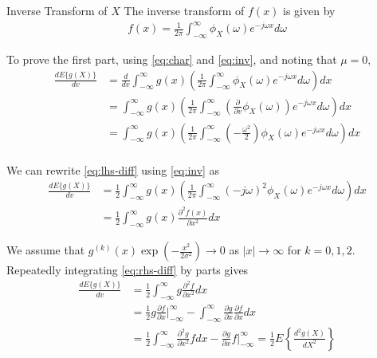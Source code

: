 \documentclass{beamer}
\begin{document}
\begin{frame}
	\begin{alertblock}{Inverse Transform of $X$}
		The inverse transform of $f(x)$ is given by
		\begin{align}
			f(x) = \frac{1}{2\pi}\int_{-\infty}^{\infty}\phi_X(\omega)e^{-j\omega x}d\omega
			\label{eq:inv}
		\end{align}
	\end{alertblock}
	To prove the first part, using \eqref{eq:char} and \eqref{eq:inv}, and noting that $\mu = 0$,
	\begin{align}
		\frac{dE\{g(X)\}}{dv} &= \frac{d}{dv}\int_{-\infty}^{\infty}g(x)\left(\frac{1}{2\pi}\int_{-\infty}^{\infty}\phi_X(\omega)e^{-j\omega x}d\omega\right)dx \\
		&= \int_{-\infty}^{\infty}g(x)\left(\frac{1}{2\pi}\int_{-\infty}^{\infty}\left(\frac{\partial}{\partial v}\phi_X(\omega)\right)e^{-j\omega x}d\omega\right)dx \\
		&= \int_{-\infty}^{\infty}g(x)\left(\frac{1}{2\pi}\int_{-\infty}^{\infty}\left(-\frac{\omega^2}{2}\right)\phi_X(\omega)e^{-j\omega x}d\omega\right)dx \\
		\label{eq:lhs-diff}
	\end{align}
\end{frame}

\begin{frame}
	We can rewrite \eqref{eq:lhs-diff} using \eqref{eq:inv} as
	\begin{align}
		\frac{dE\{g(X)\}}{dv} &= \frac{1}{2}\int_{-\infty}^{\infty}g(x)\left(\frac{1}{2\pi}\int_{-\infty}^{\infty}(-j\omega)^2\phi_X(\omega)e^{-j\omega x}d\omega\right)dx \\
		&= \frac{1}{2}\int_{-\infty}^{\infty}g(x)\frac{\partial^2f(x)}{\partial x^2}dx
		\label{eq:rhs-diff}
	\end{align}

	\noindent We assume that $g^{(k)}(x)\exp{(-\frac{x^2}{2\sigma^2})} \to 0$ as $|x| \to \infty$ for $k = 0, 1, 2$. Repeatedly integrating \eqref{eq:rhs-diff} by parts gives
	\begin{align}
		\frac{dE\{g(X)\}}{dv} &= \frac{1}{2}\int_{-\infty}^{\infty}g\frac{\partial^2f}{\partial x^2}dx \\
		&= \frac{1}{2}g\frac{\partial f}{\partial x}\Big|_{-\infty}^{\infty} - \int_{-\infty}^{\infty}\frac{\partial g}{\partial x}\frac{\partial f}{\partial x}dx \\
		&= \frac{1}{2}\int_{-\infty}^{\infty}\frac{\partial^2g}{\partial x^2}fdx - \frac{\partial g}{\partial x}f\Big|_{-\infty}^{\infty} = \frac{1}{2}E\left\{\frac{d^2g(X)}{dX^2}\right\} 
		\label{eq:sol1}
	\end{align}
\end{frame}
\end{document}
